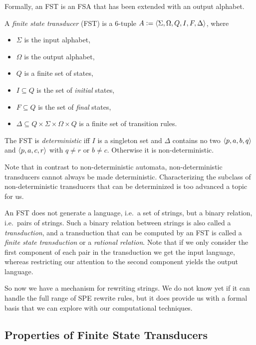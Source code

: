 Formally, an FST is an FSA that has been extended with an output alphabet.
%
\begin{definition}
    A \emph{finite state transducer} (FST) is a 6-tuple $A \mathrel{\mathop:}= \left \langle \Sigma, \Omega, Q, I, F, \Delta \right \rangle $, where
    \begin{itemize}
        \item $\Sigma$ is the input alphabet,
        \item $\Omega$ is the output alphabet,
        \item $Q$ is a finite set of states,
        \item $I \subseteq Q$ is the set of \emph{initial} states,
        \item $F \subseteq Q$ is the set of \emph{final} states,
        \item $\Delta \subseteq Q \times \Sigma \times \Omega \times Q$ is a finite set of transition rules.
    \end{itemize}
    The FST is \emph{deterministic} iff $I$ is a singleton set and $\Delta$ contains no two $\left \langle p,a,b,q \right \rangle $ and $\left \langle p,a,c,r \right \rangle $ with $q \neq r$ or $b \neq c$.
    Otherwise it is non-deterministic.
\end{definition}
%
Note that in contrast to non-deterministic automata, non-deterministic transducers cannot always be made deterministic.
Characterizing the subclass of non-deterministic transducers that can be determinized is too advanced a topic for us.

An FST does not generate a language, i.e.\ a set of strings, but a binary relation, i.e.\ pairs of strings.
Such a binary relation between strings is also called a \emph{transduction}, and a transduction that can be computed by an FST is called a \emph{finite state transduction} or a \emph{rational relation}.
Note that if we only consider the first component of each pair in the transduction we get the input language, whereas restricting our attention to the second component yields the output language.

So now we have a mechanism for rewriting strings.
We do not know yet if it can handle the full range of SPE rewrite rules, but it does provide us with a formal basis that we can explore with our computational techniques.

\subsection{Properties of Finite State Transducers}

